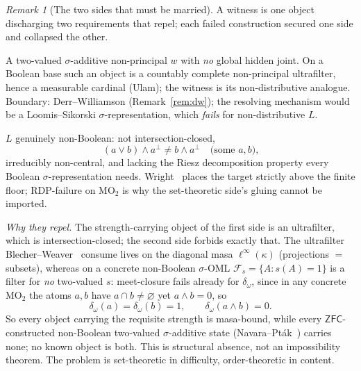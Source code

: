 \documentclass[11pt,reqno]{amsart}
\theoremstyle{plain}
\theoremstyle{definition}
\theoremstyle{remark}
\newtheorem{remark}[theorem]{Remark}
\begin{document}
\begin{remark}[The two sides that must be married]\label{rem:marriage}
A witness is one object discharging two requirements that repel; each failed
construction secured one side and collapsed the other.
\begin{description}[noitemsep,topsep=2pt]
  \item[Set-theoretic side.] A two-valued $\sigma$-additive non-principal $w$ with
    \emph{no} global hidden joint. On a Boolean base such an object is a countably
    complete non-principal ultrafilter, hence a measurable cardinal (Ulam); the
    witness is its non-distributive analogue. Boundary: Derr--Williamson
    (Remark~\ref{rem:dw}); the resolving mechanism would be a Loomis--Sikorski
    $\sigma$-representation, which \emph{fails} for non-distributive $L$.
  \item[Order-theoretic side.] $L$ genuinely non-Boolean: not intersection-closed,
    \[
      (a\vee b)\wedge a^{\perp}\neq b\wedge a^{\perp}\quad\text{(some $a,b$),}
    \]
    irreducibly non-central, and lacking the Riesz decomposition property every
    Boolean $\sigma$-representation needs. Wright~\cite{Wright1978} places the target
    strictly above the finite floor; RDP-failure on $\mathrm{MO}_2$ is why the
    set-theoretic side's gluing cannot be imported.
\end{description}
\noindent\emph{Why they repel.} The strength-carrying object of the first side is an
ultrafilter, which is intersection-closed; the second side forbids exactly that. The
ultrafilter Blecher--Weaver~\cite{BlecherWeaver2017} consume lives on the diagonal masa
$\ell^{\infty}(\kappa)$ (projections $=$ subsets), whereas on a concrete non-Boolean
$\sigma$-OML $\mathcal{F}_s=\{A:s(A)=1\}$ is a filter for \emph{no} two-valued $s$:
meet-closure fails already for $\delta_\omega$, since in any concrete $\mathrm{MO}_2$
the atoms $a,b$ have $a\cap b\neq\varnothing$ yet $a\wedge b=0$, so
\[
  \delta_\omega(a)=\delta_\omega(b)=1,\qquad \delta_\omega(a\wedge b)=0 .
\]
So every object carrying the requisite strength is masa-bound, while every
$\mathsf{ZFC}$-constructed non-Boolean two-valued $\sigma$-additive state
(Navara--Pt\'{a}k~\cite{NavaraPtak1983}) carries none; no known object is both. This is
structural absence, not an impossibility theorem. The problem is set-theoretic in
difficulty, order-theoretic in content.
\end{remark}
\end{document}
